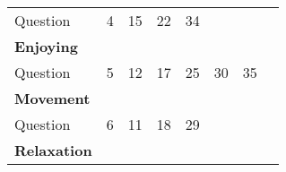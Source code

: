 \documentclass[../main.tex]{subfiles}
\begin{document}
\begin{tabular}{l|p{10mm}|p{10mm}|p{10mm}|p{10mm}|p{10mm}|p{10mm}||l}
  \cellcolor{lightgray} Question & \cellcolor{lightgray} 4 & \cellcolor{lightgray} 15 &
  \cellcolor{lightgray} 22 & \cellcolor{lightgray} 34 & \cellcolor{lightgray}  & \cellcolor{lightgray} & \\
  \textbf{Enjoying} & & & & & & & \\ \hline
  \cellcolor{lightgray} Question & \cellcolor{lightgray} 5 & \cellcolor{lightgray} 12 &
  \cellcolor{lightgray} 17 & \cellcolor{lightgray} 25 & \cellcolor{lightgray} 30 &
  \cellcolor{lightgray} 35 & \\
  \textbf{Movement} & & & & & & & \\ \hline
  \cellcolor{lightgray} Question & \cellcolor{lightgray} 6 & \cellcolor{lightgray} 11 &
  \cellcolor{lightgray} 18 & \cellcolor{lightgray} 29 & \cellcolor{lightgray}  &
  \cellcolor{lightgray} & \\
  \textbf{Relaxation} & & & & & & & \\ \hline

\end{tabular}
\end{document}
